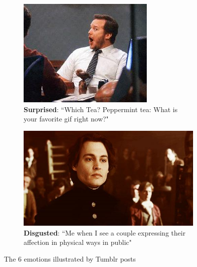 \begin{figure}
\begin{subfigure}[t]{.5\textwidth}
  \includegraphics[width=.8\linewidth]{Images/surprised.jpg}
  \caption{\textbf{Surprised}: ``Which Tea? Peppermint tea: What is your favorite gif right now?"}
\end{subfigure}
\begin{subfigure}[t]{.5\textwidth}
  \vskip 0pt 
  \centering
  \includegraphics[width=.8\linewidth]{Images/disgusted.jpg}
  \caption{\textbf{Disgusted}: ``Me when I see a couple expressing their affection in physical ways in public"}
\end{subfigure}
\caption{The 6 emotions illustrated by Tumblr posts \cite{tumblr-photos}}
\label{fig:emotions}
\end{figure}